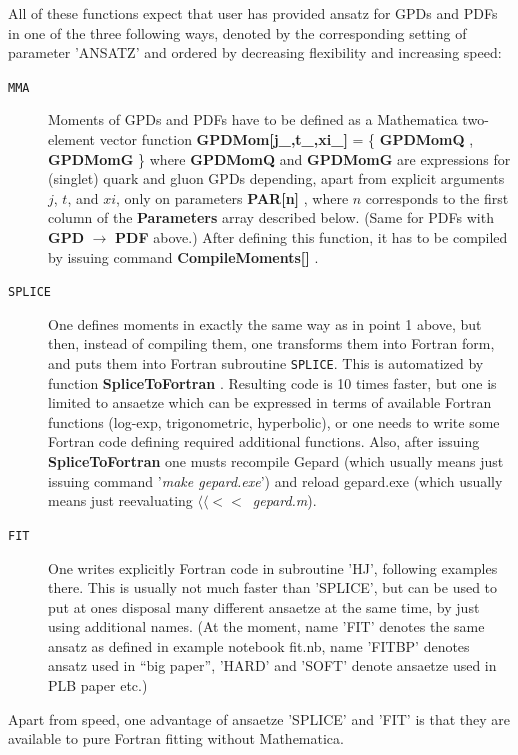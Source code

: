 \documentclass[12pt]{article}
\newcommand{\mmacomm}[1]{ {\ttfamily \bfseries #1} }
\begin{document}
All of these functions expect that user has provided ansatz for GPDs and PDFs
in one of the three following ways, denoted by the corresponding setting
of parameter 'ANSATZ' and ordered by decreasing flexibility and increasing speed:

\begin{description}
\item[\texttt{MMA}] 
Moments of GPDs and PDFs have to be defined as a Mathematica two-element vector function
\mmacomm{GPDMom[j\_,t\_,xi\_]} = \{\mmacomm{GPDMomQ}, \mmacomm{GPDMomG} \}  where 
\mmacomm{GPDMomQ} and \mmacomm{GPDMomG} are expressions for (singlet) quark and gluon GPDs
depending, apart from explicit arguments $j$, $t$, and $xi$, only on
parameters \mmacomm{PAR[n]}, where $n$ corresponds to the first column of the \mmacomm{Parameters}
array described below. (Same for PDFs with \mmacomm{GPD}$\to$\mmacomm{PDF} above.) 
After defining this function, it has to be compiled by issuing command \mmacomm{CompileMoments[]}.

\item[\texttt{SPLICE}] 
One defines moments in exactly the same way as in point 1 above, but then, instead of compiling
them, one transforms them into Fortran form, and puts them into Fortran subroutine
\texttt{SPLICE}. This is automatized by function \mmacomm{SpliceToFortran}. Resulting code
is 10 times faster, but one is limited to ansaetze which can be expressed in terms of available
Fortran functions (log-exp, trigonometric, hyperbolic), or one needs to write some
Fortran code defining required additional functions. Also, after issuing \mmacomm{SpliceToFortran}
one musts recompile Gepard (which usually means just issuing command '\emph{make gepard.exe}')
and reload gepard.exe (which usually means just reevaluating $\langle\langle<<$~\emph{gepard.m}).

\item[\texttt{FIT}] 
One writes explicitly Fortran code in subroutine 'HJ', following examples there. This
is usually not much faster than 'SPLICE', but can be used to put at ones disposal
many different ansaetze at the same time, by just using additional names.
(At the moment, name 'FIT' denotes the same ansatz as defined in example notebook fit.nb,
name 'FITBP' denotes ansatz used in ``big paper'', 'HARD' and 'SOFT' denote ansaetze used in
PLB paper etc.)
\end{description}

Apart from speed, one advantage of ansaetze 'SPLICE' and 'FIT' is that they are
available to pure Fortran fitting without Mathematica.
\end{document}
